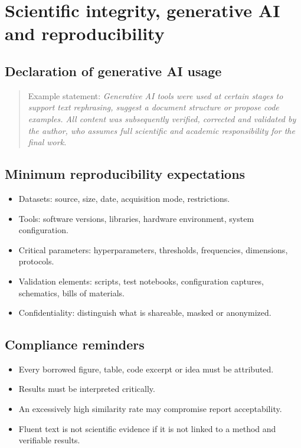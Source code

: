 \chapter{Scientific integrity, generative AI and reproducibility}

\section{Declaration of generative AI usage}

\begin{quote}
Example statement: \textit{Generative AI tools were used at certain stages to support text rephrasing, suggest a document structure or propose code examples. All content was subsequently verified, corrected and validated by the author, who assumes full scientific and academic responsibility for the final work.}
\end{quote}

\section{Minimum reproducibility expectations}
\begin{itemize}[leftmargin=1.2cm]
\item Datasets: source, size, date, acquisition mode, restrictions.
\item Tools: software versions, libraries, hardware environment, system configuration.
\item Critical parameters: hyperparameters, thresholds, frequencies, dimensions, protocols.
\item Validation elements: scripts, test notebooks, configuration captures, schematics, bills of materials.
\item Confidentiality: distinguish what is shareable, masked or anonymized.
\end{itemize}

\section{Compliance reminders}
\begin{itemize}[leftmargin=1.2cm]
\item \okitem{} Every borrowed figure, table, code excerpt or idea must be attributed.
\item \okitem{} Results must be interpreted critically.
\item \warnitem{} An excessively high similarity rate may compromise report acceptability.
\item \warnitem{} Fluent text is not scientific evidence if it is not linked to a method and verifiable results.
\end{itemize}
